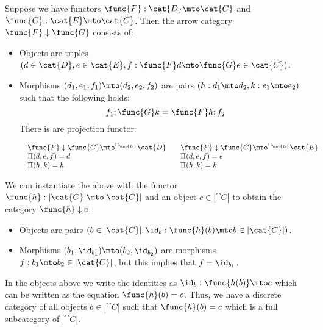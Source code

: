 \begin{definition}
\label{def:comma_category}
Suppose we have functors $\func{F} : \cat{D} \mto \cat{C}$ and
$\func{G} : \cat{E} \mto \cat{C}$.  Then the arrow category 
$\func{F} \downarrow \func{G}$ consists of:
\begin{itemize}
\item Objects are triples 
      $(d \in \cat{D}, e \in \cat{E}, 
        f : \func{F}d \mto \func{G}e \in \cat{C})$.
\item Morphisms $(d_1,e_1,f_1) \mto (d_2,e_2,f_2)$ are pairs 
      $(h : d_1 \mto d_2,k : e_1 \mto e_2)$ such that the following holds:
      \[
           f_1;\func{G}k = \func{F}h;f_2
      \]
      There is are projection functor:
      \begin{center}
        \begin{math}
            \begin{array}{lll}
                \begin{array}{lll}
                    \func{F} \downarrow \func{G} \mto^{\Pi_{\cat{D}}} \cat{D}\\
                    \Pi(d,e,f) = d\\
                    \Pi(h,k) = h
               \end{array}
               &
               \begin{array}{lll}
                    \func{F} \downarrow \func{G} \mto^{\Pi_{\cat{E}}} \cat{E}\\
                    \Pi(d,e,f) = e\\
                    \Pi(h,k) = k
               \end{array}
            \end{array}
        \end{math}
    \end{center}
\end{itemize}
\end{definition}
\noindent
We can instantiate the above with the functor $\func{h} : |\cat{C}|
\mto |\cat{C}|$ and an object $c \in |\cat{C}|$ to obtain the
category $\func{h} \downarrow c$:
\begin{itemize}
\item Objects are pairs $(b \in |\cat{C}|, \id_{b} : \func{h}(b)
\mto b \in |\cat{C}|)$.

\item Morphisms $(b_1,\id_{b_1}) \mto (b_2,\id_{b_2})$ are morphisms
$f : b_1 \mto b_2 \in |\cat{C}|$, but this implies that $f = \id_{b_1}$.
\end{itemize}
In the objects above we write the identities as $\id_{b} :
\func{h(b)} \mto c$ which can be written as the equation
$\func{h}(b) = c$. Thus, we have a discrete category of all objects $b
\in |\cat{C}|$ such that $\func{h}(b) = c$ which is a full subcategory
of $|\cat{C}|$.

